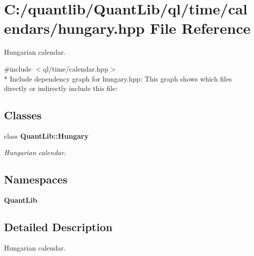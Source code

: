 \section{C\+:/quantlib/\+Quant\+Lib/ql/time/calendars/hungary.hpp File Reference}
\label{hungary_8hpp}


Hungarian calendar.  


{\ttfamily \#include $<$ql/time/calendar.\+hpp$>$}\\*
Include dependency graph for hungary.\+hpp\+:
This graph shows which files directly or indirectly include this file\+:
\subsection*{Classes}
\begin{DoxyCompactItemize}
\item 
class {\bf Quant\+Lib\+::\+Hungary}
\begin{DoxyCompactList}\small\item\em Hungarian calendar. \end{DoxyCompactList}\end{DoxyCompactItemize}
\subsection*{Namespaces}
\begin{DoxyCompactItemize}
\item 
 {\bf Quant\+Lib}
\end{DoxyCompactItemize}


\subsection{Detailed Description}
Hungarian calendar. 

